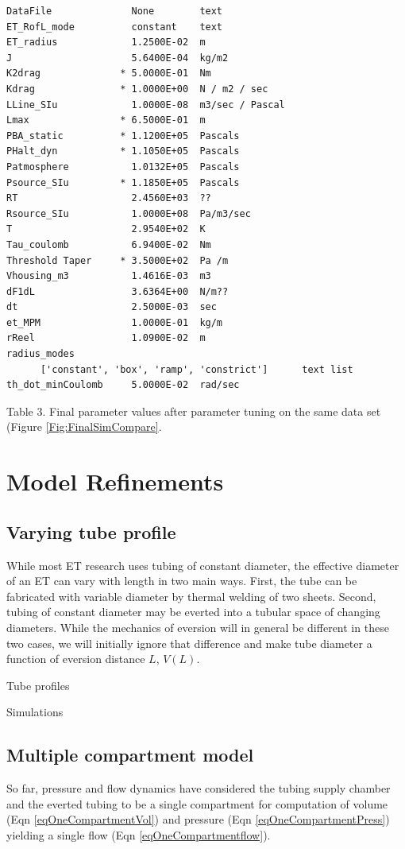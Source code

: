 \documentclass[letterpaper]{article}
\begin{document}
\begin{verbatim}
DataFile              None        text
ET_RofL_mode          constant    text
ET_radius             1.2500E-02  m
J                     5.6400E-04  kg/m2
K2drag              * 5.0000E-01  Nm
Kdrag               * 1.0000E+00  N / m2 / sec
LLine_SIu             1.0000E-08  m3/sec / Pascal
Lmax                * 6.5000E-01  m
PBA_static          * 1.1200E+05  Pascals
PHalt_dyn           * 1.1050E+05  Pascals
Patmosphere           1.0132E+05  Pascals
Psource_SIu         * 1.1850E+05  Pascals
RT                    2.4560E+03  ??
Rsource_SIu           1.0000E+08  Pa/m3/sec
T                     2.9540E+02  K
Tau_coulomb           6.9400E-02  Nm
Threshold Taper     * 3.5000E+02  Pa /m
Vhousing_m3           1.4616E-03  m3
dF1dL                 3.6364E+00  N/m??
dt                    2.5000E-03  sec
et_MPM                1.0000E-01  kg/m
rReel                 1.0900E-02  m
radius_modes
      ['constant', 'box', 'ramp', 'constrict']      text list
th_dot_minCoulomb     5.0000E-02  rad/sec
\end{verbatim}
Table 3. Final  parameter values after parameter tuning on the
same data set (Figure \ref{Fig:FinalSimCompare}.





\clearpage



\section{Model Refinements}

\subsection{Varying tube profile}

While most ET research uses tubing of constant diameter, the effective diameter of an ET can vary with
length in two main ways.   First, the tube can be fabricated with variable diameter by thermal welding of two sheets.
Second, tubing of constant diameter may be everted into a tubular space of changing diameters.
While the mechanics of eversion will in general be different in these two cases, we will initially ignore that difference
and make tube diameter a function of eversion distance $L$, $V(L)$.

Tube profiles

Simulations


\subsection{Multiple compartment model}
So far, pressure and flow dynamics have considered the tubing supply chamber and the everted tubing to be a single compartment
for computation of volume (Eqn \ref{eqOneCompartmentVol}) and pressure (Eqn \ref{eqOneCompartmentPress}) yielding a single
flow (Eqn \ref{eqOneCompartmentflow}).
\end{document}
